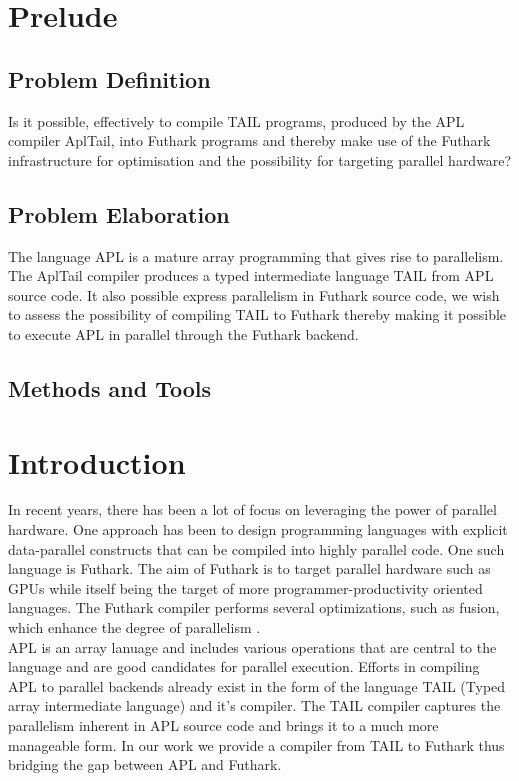 \documentclass[11pt]{article}
\begin{document}
\section{Prelude}
\subsection{Problem Definition}
Is it possible, effectively to compile TAIL programs, produced by the APL compiler AplTail,
into Futhark programs and thereby make use of the Futhark infrastructure for optimisation
and the possibility for targeting parallel hardware?
\subsection{Problem Elaboration}
The language APL is a mature array programming that gives rise to parallelism. The AplTail compiler produces
a typed intermediate language TAIL from APL source code. It also possible express parallelism in Futhark source code,
we wish to assess the possibility of compiling TAIL to Futhark thereby making it possible to execute APL in parallel through
the Futhark backend.
\subsection{Methods and Tools}
\section{Introduction}

In recent years, there has been a lot of focus on leveraging the power of parallel hardware. 
One approach has been to design programming languages with explicit data-parallel constructs that can be compiled 
into highly parallel code. One such language is Futhark. The aim of Futhark is to target parallel hardware such as 
GPUs while itself being the target of more programmer-productivity oriented languages. The Futhark compiler 
performs several optimizations, such as fusion, which enhance the degree of 
parallelism \cite{T.Henriksen&C.Oancea}.\\

APL is an array lanuage and includes various operations that are central to the language and are good candidates 
for parallel execution. Efforts in compiling APL to parallel backends already exist in the form of the language 
TAIL (Typed array intermediate language) and it’s compiler. The TAIL compiler captures the parallelism inherent in 
APL source code and brings it to a much more manageable form. In our work we provide a compiler from TAIL 
to Futhark thus bridging the gap between APL and Futhark.\\
\end{document}
